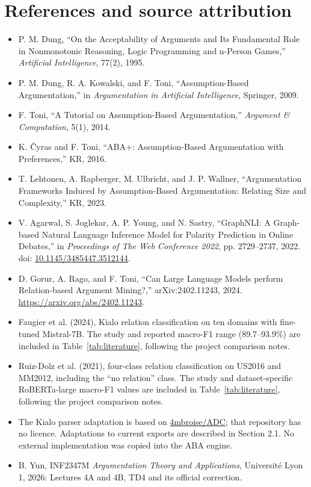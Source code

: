 \documentclass[11pt,a4paper]{article}
\begin{document}
\section{References and source attribution}
\begin{itemize}
  \item P. M. Dung, ``On the Acceptability of Arguments and Its Fundamental Role in Nonmonotonic Reasoning, Logic Programming and n-Person Games,'' \emph{Artificial Intelligence}, 77(2), 1995.
  \item P. M. Dung, R. A. Kowalski, and F. Toni, ``Assumption-Based Argumentation,'' in \emph{Argumentation in Artificial Intelligence}, Springer, 2009.
  \item F. Toni, ``A Tutorial on Assumption-Based Argumentation,'' \emph{Argument \& Computation}, 5(1), 2014.
  \item K. \v{C}yras and F. Toni, ``ABA+: Assumption-Based Argumentation with Preferences,'' KR, 2016.
  \item T. Lehtonen, A. Rapberger, M. Ulbricht, and J. P. Wallner, ``Argumentation Frameworks Induced by Assumption-Based Argumentation: Relating Size and Complexity,'' KR, 2023.
  \item V. Agarwal, S. Joglekar, A. P. Young, and N. Sastry, ``GraphNLI: A Graph-based Natural Language Inference Model for Polarity Prediction in Online Debates,'' in \emph{Proceedings of The Web Conference 2022}, pp. 2729--2737, 2022. doi: \href{https://doi.org/10.1145/3485447.3512144}{10.1145/3485447.3512144}.
  \item D. Gorur, A. Rago, and F. Toni, ``Can Large Language Models perform Relation-based Argument Mining?,'' arXiv:2402.11243, 2024. \href{https://arxiv.org/abs/2402.11243}{https://arxiv.org/abs/2402.11243}.
  \item Faugier et al. (2024), Kialo relation classification on ten domains with fine-tuned Mistral-7B. The study and reported macro-F1 range (89.7--93.9\%) are included in Table~\ref{tab:literature}, following the project comparison notes.
  \item Ruiz-Dolz et al. (2021), four-class relation classification on US2016 and MM2012, including the ``no relation'' class. The study and dataset-specific RoBERTa-large macro-F1 values are included in Table~\ref{tab:literature}, following the project comparison notes.
  \item The Kialo parser adaptation is based on \href{https://github.com/4mbroise/ADC}{4mbroise/ADC}; that repository has no licence. Adaptations to current exports are described in Section 2.1. No external implementation was copied into the ABA engine.
  \item B. Yun, INF2347M \emph{Argumentation Theory and Applications}, Universit\'e Lyon 1, 2026: Lectures 4A and 4B, TD4 and its official correction.
\end{itemize}
\end{document}
